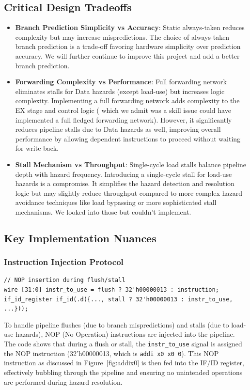 \documentclass{article}
\numberwithin{figure}{section}
\numberwithin{table}{section}
\begin{document}
\subsection{Critical Design Tradeoffs}
\begin{itemize}
\item \textbf{Branch Prediction Simplicity vs Accuracy}: Static always-taken reduces complexity but may increase mispredictions. The choice of always-taken branch prediction is a trade-off favoring hardware simplicity over prediction accuracy. We will further continue to improve this project and add a better branch prediction.

\item \textbf{Forwarding Complexity vs Performance}: Full forwarding network eliminates stalls for Data hazards (except load-use) but increases logic complexity. Implementing a full forwarding network adds complexity to the EX stage and control logic ( which we admit was a skill issue could have implemented a full fledged forwarding network). However, it significantly reduces pipeline stalls due to Data hazards as well, improving overall performance by allowing dependent instructions to proceed without waiting for write-back.

\item \textbf{Stall Mechanism vs Throughput}: Single-cycle load stalls balance pipeline depth with hazard frequency. Introducing a single-cycle stall for load-use hazards is a compromise. It simplifies the hazard detection and resolution logic but may slightly reduce throughput compared to more complex hazard avoidance techniques like load bypassing or more sophisticated stall mechanisms. We looked into those but couldn't implement.

\end{itemize}
\subsection{Key Implementation Nuances}
\subsubsection{Instruction Injection Protocol}
\begin{lstlisting}[style=verilog-style]
// NOP insertion during flush/stall
wire [31:0] instr_to_use = flush ? 32'h00000013 : instruction;
if_id_register if_id(.d({..., stall ? 32'h00000013 : instr_to_use, ...}));\end{lstlisting}
    To handle pipeline flushes (due to branch mispredictions) and stalls (due to load-use hazards), NOP (No Operation) instructions are injected into the pipeline. The code shows that during a flush or stall, the \texttt{instr\_to\_use} signal is assigned the NOP instruction (32'h00000013, which is \texttt{addi x0 x0 0}). This NOP instruction as discussed in Figure~\ref{fig:addix0} is then fed into the IF/ID register, effectively bubbling through the pipeline and ensuring no unintended operations are performed during hazard resolution.
\end{document}
